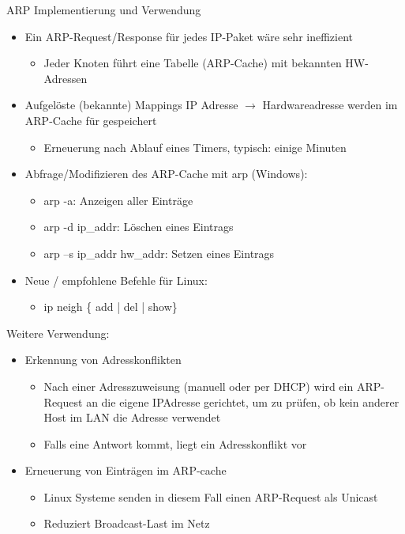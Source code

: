\begin{KR}{ARP Implementierung und Verwendung}
    \begin{itemize}
        \item Ein ARP-Request/Response für jedes IP-Paket wäre sehr ineffizient
        \begin{itemize}
            \item Jeder Knoten führt eine Tabelle (ARP-Cache) mit bekannten HW-Adressen
        \end{itemize}
        \item Aufgelöste (bekannte) Mappings IP Adresse $\rightarrow$ Hardwareadresse werden im ARP-Cache für gespeichert
        \begin{itemize}
            \item Erneuerung nach Ablauf eines Timers, typisch: einige Minuten
        \end{itemize}
        \item Abfrage/Modifizieren des ARP-Cache mit arp (Windows):
        \begin{itemize}
            \item arp -a: Anzeigen aller Einträge
            \item arp -d ip\_addr: Löschen eines Eintrags
            \item arp –s ip\_addr hw\_addr: Setzen eines Eintrags
        \end{itemize}
        \item Neue / empfohlene Befehle für Linux:
        \begin{itemize}
            \item ip neigh \{ add | del | show\}
        \end{itemize}
    \end{itemize}
    Weitere Verwendung:
    \begin{itemize}
        \item Erkennung von Adresskonflikten
        \begin{itemize}
            \item Nach einer Adresszuweisung (manuell oder per DHCP) wird ein ARP-Request an die eigene IPAdresse gerichtet, um zu prüfen, ob kein anderer Host im LAN die Adresse verwendet
            \item Falls eine Antwort kommt, liegt ein Adresskonflikt vor
        \end{itemize}
        \item Erneuerung von Einträgen im ARP-cache
        \begin{itemize}
            \item Linux Systeme senden in diesem Fall einen ARP-Request als Unicast
            \item Reduziert Broadcast-Last im Netz
        \end{itemize}
    \end{itemize}
\end{KR}



